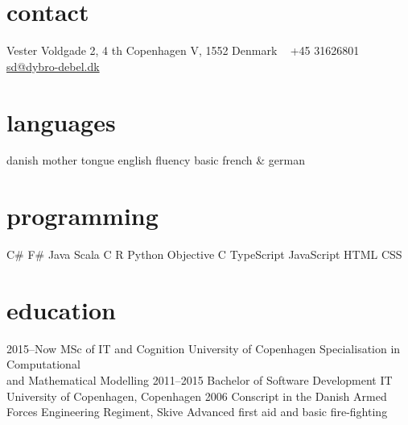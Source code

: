 \documentclass[]{friggeri-cv} %
\begin{document}


\begin{aside} %
\section{contact}
Vester Voldgade 2, 4 th
Copenhagen V, 1552
Denmark
~
+45 31626801
~
\href{mailto:sd@dybro-debel.dk}{sd@dybro-debel.dk}
\section{languages}
danish mother tongue
english fluency
basic french \& german
\section{programming}
C\# F\# Java Scala C R 
Python Objective C 
TypeScript JavaScript 
HTML CSS
\end{aside}


\section{education}

\begin{entrylist}
\entry
{2015--Now}
{MSc {\normalfont of IT and Cognition}}
{University of Copenhagen}
{Specialisation in Computational\\and Mathematical Modelling}
\entry
{2011--2015}
{Bachelor {\normalfont of Software Development}}
{IT University of Copenhagen, Copenhagen}
{}
\entry
{2006}
{Conscript {\normalfont in the Danish Armed Forces}}
{Engineering Regiment, Skive}
{Advanced first aid and basic fire-fighting}
\end{entrylist}
\end{document}

